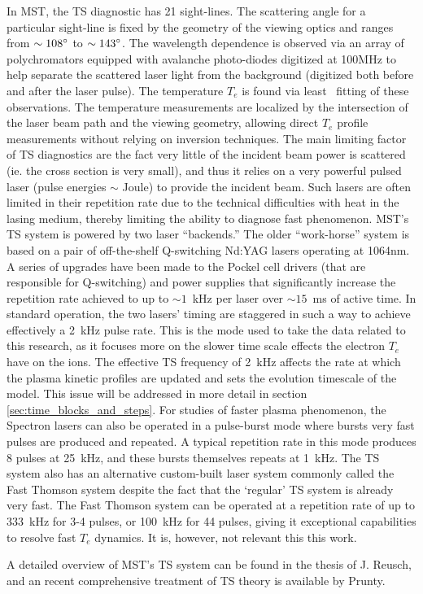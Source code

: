 In MST, the TS diagnostic has 21 sight-lines. The scattering angle for a particular sight-line is fixed by the geometry of the viewing optics and ranges from $\sim 108\degree$ to $\sim 143\degree$. The wavelength dependence is observed via an array of polychromators equipped with avalanche photo-diodes digitized at 100MHz to help separate the scattered laser light from the background (digitized both before and after the laser pulse). The temperature $T_e$ is found via least \chisq\ fitting of these observations. The temperature measurements are localized by the intersection of the laser beam path and the viewing geometry, allowing direct $T_e$ profile measurements without relying on inversion techniques. The main limiting factor of TS diagnostics are the fact very little of the incident beam power is scattered (ie. the cross section is very small), and thus it relies on a very powerful pulsed laser (pulse energies $\sim$ Joule) to provide the incident beam. Such lasers are often limited in their repetition rate due to the technical difficulties with heat in the lasing medium, thereby limiting the ability to diagnose fast phenomenon. MST's TS system is powered by two laser ``backends.'' The older ``work-horse'' system is based on a pair of off-the-shelf Q-switching Nd:YAG lasers operating at 1064nm. A series of upgrades have been made to the Pockel cell drivers (that are responsible for Q-switching) and power supplies that significantly increase the repetition rate achieved to up to $\sim 1$~kHz per laser over $\sim 15$~ms of active time\cite{DenHartog2010}. In standard operation, the two lasers' timing are staggered in such a way to achieve effectively a 2~kHz pulse rate. This is the mode used to take the data related to this research, as it focuses more on the slower time scale effects the electron $T_e$ have on the ions. The effective TS frequency of 2~kHz affects the rate at which the plasma kinetic profiles are updated and sets the evolution timescale of the model. This issue will be addressed in more detail in section \ref{sec:time_blocks_and_steps}. For studies of faster plasma phenomenon, the Spectron lasers can also be operated in a pulse-burst mode\cite{DenHartog2010} where bursts very fast pulses are produced and repeated. A typical repetition rate in this mode produces 8 pulses at 25~kHz, and these bursts themselves repeats at 1~kHz. The TS system also has an alternative custom-built laser system commonly called the Fast Thomson system despite the fact that the `regular' TS system is already very fast. The Fast Thomson system can be operated at a repetition rate of up to 333~kHz for 3-4 pulses, or 100~kHz for 44 pulses\cite{Young2015}, giving it exceptional capabilities to resolve fast $T_e$ dynamics. It is, however, not relevant this this work. 

A detailed overview of MST's TS system can be found in the thesis of J. Reusch\cite{Reusch2011}, and an recent comprehensive treatment of TS theory is available by Prunty\cite{Prunty2014}.
